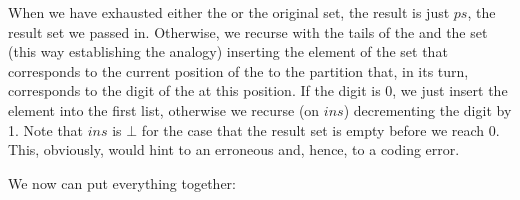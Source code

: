 \documentclass{scrreprt}
\newcommand{\Varid}[1]{\mathit{#1}}
\begin{document}
When we have exhausted either the  or
the original set, the result is just $ps$,
the result set we passed in.
Otherwise, we recurse with the tails 
of the  and the set
(this way establishing the analogy)
inserting the element of the set that corresponds
to the current position of the 
to the partition that, in its turn, corresponds
to the digit of the  at this position.
If the digit is 0, we just insert the element into the first list,
otherwise we recurse (on \ensuremath{\Varid{ins}}) 
decrementing the digit by 1.
Note that \ensuremath{\Varid{ins}} is \ensuremath{\bot } for the case
that the result set is empty before we reach 0.
This, obviously, would hint to an erroneous 
and, hence, to a coding error.

We now can put everything together:
\end{document}
